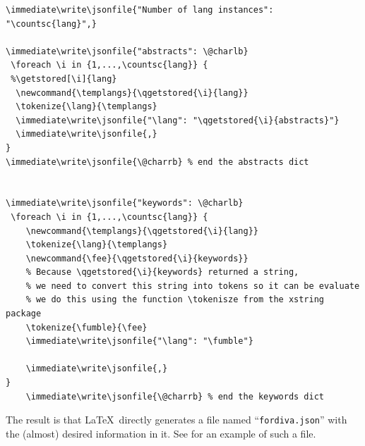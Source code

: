 \begin{lstlisting}[language={[LaTeX]TeX}, caption={Writing out the language, abstract, and keywords information}, label=lst:writinglangAndKeywords]
\immediate\write\jsonfile{"Number of lang instances": "\countsc{lang}",}

\immediate\write\jsonfile{"abstracts": \@charlb}
 \foreach \i in {1,...,\countsc{lang}} {
 %\getstored[\i]{lang}
  \newcommand{\templangs}{\qgetstored{\i}{lang}}
  \tokenize{\lang}{\templangs}
  \immediate\write\jsonfile{"\lang": "\qgetstored{\i}{abstracts}"}
  \immediate\write\jsonfile{,}
}
\immediate\write\jsonfile{\@charrb} % end the abstracts dict


\immediate\write\jsonfile{"keywords": \@charlb}
 \foreach \i in {1,...,\countsc{lang}} {
    \newcommand{\templangs}{\qgetstored{\i}{lang}}
    \tokenize{\lang}{\templangs}
    \newcommand{\fee}{\qgetstored{\i}{keywords}}
    % Because \qgetstored{\i}{keywords} returned a string,
    % we need to convert this string into tokens so it can be evaluate
    % we do this using the function \tokenisze from the xstring package
    \tokenize{\fumble}{\fee}
    \immediate\write\jsonfile{"\lang": "\fumble"}

    \immediate\write\jsonfile{,}
}
    \immediate\write\jsonfile{\@charrb} % end the keywords dict
\end{lstlisting}	


The result is that \LaTeX~directly generates a file named “\texttt{fordiva.json}” with the (almost) desired information in it. See  for an example of such a file.

